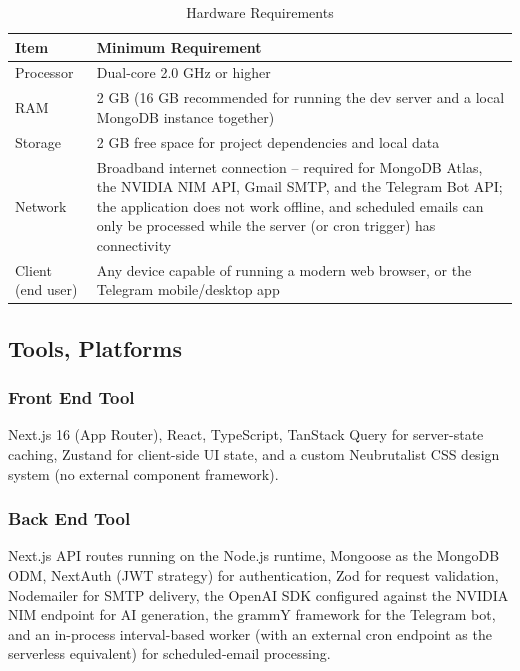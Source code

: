 \documentclass[12pt,a4paper]{article}
\begin{document}
\begin{table}[h]
\centering
\caption{Hardware Requirements}
\begin{tabularx}{\textwidth}{@{}l X@{}}
\toprule
\textbf{Item} & \textbf{Minimum Requirement} \\
\midrule
Processor  &  Dual-core 2.0 GHz or higher \\
RAM        & 2 GB (16 GB recommended for running the dev server and a local MongoDB instance together) \\
Storage                          & 2 GB free space for project dependencies and local data \\
Network                          & Broadband internet connection -- required for MongoDB Atlas, the NVIDIA NIM API, Gmail SMTP, and the Telegram Bot API; the application does not work offline, and scheduled emails can only be processed while the server (or cron trigger) has connectivity \\
Client (end user)                & Any device capable of running a modern web browser, or the Telegram mobile/desktop app \\
\bottomrule
\end{tabularx}
\end{table}

\subsection{Tools, Platforms}

\subsubsection{Front End Tool}
Next.js 16 (App Router), React, TypeScript, TanStack Query for server-state caching, Zustand for client-side UI state, and a custom Neubrutalist CSS design system (no external component framework).

\subsubsection{Back End Tool}
Next.js API routes running on the Node.js runtime, Mongoose as the MongoDB ODM, NextAuth (JWT strategy) for authentication, Zod for request validation, Nodemailer for SMTP delivery, the OpenAI SDK configured against the NVIDIA NIM endpoint for AI generation, the grammY framework for the Telegram bot, and an in-process interval-based worker (with an external cron endpoint as the serverless equivalent) for scheduled-email processing.
\end{document}
